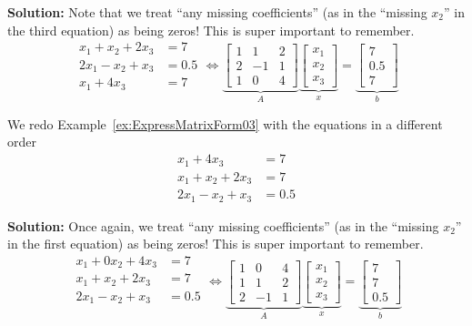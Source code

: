 \textbf{Solution:} Note that we treat ``any missing coefficients'' (as in the ``missing $x_2$'' in the third equation) as being zeros! This is super important to remember. 
\begin{equation}
\label{eq:Axeqb04}
\begin{aligned}
x_1+x_2+2x_3 &=7 \\
2x_1-x_2+x_3&=0.5\\
x_1 + 4 x_3 &=7
\end{aligned}
\iff \underbrace{\left[\begin{array}{rrr} 1 & 1 & 2\\
2 & -1 & 1 \\ 1 & \boxed{0} & 4\end{array}\right]}_{A} \underbrace{\left[\begin{array}{c} x_1\\ x_2 \\ x_3\end{array}\right]}_{x} =   \underbrace{\left[\begin{array}{c} 7\\ 0.5 \\ 7\end{array}\right]}_{b}
\end{equation}
\Qed

\begin{example}
\label{ex:ExpressMatrixForm03B}
We redo Example~\ref{ex:ExpressMatrixForm03}  with the equations in a different order
\begin{equation}
\begin{aligned}
x_1 + 4 x_3 &=7 \\
x_1+x_2+2x_3 &=7 \\
2x_1-x_2+x_3&=0.5
\end{aligned}
\end{equation}
\end{example}

\textbf{Solution:} Once again,  we treat ``any missing coefficients'' (as in the ``missing $x_2$'' in the first equation) as being zeros! This is super important to remember. 
\begin{equation}
\label{eq:Axeqb04C}
\begin{aligned}
x_1 + \boxed{ 0 x_2} +  4 x_3 &=7\\
x_1+x_2+2x_3 &=7 \\
2x_1-x_2+x_3&=0.5\\
\end{aligned}
\iff \underbrace{\left[\begin{array}{rrr} 1 & \boxed{0} & 4 \\ 1 & 1 & 2\\
2 & -1 & 1 \end{array}\right]}_{A} \underbrace{\left[\begin{array}{c} x_1\\ x_2 \\ x_3\end{array}\right]}_{x} =   \underbrace{\left[\begin{array}{c} 7 \\ 7\\ 0.5\end{array}\right]}_{b}
\end{equation}
\Qed

